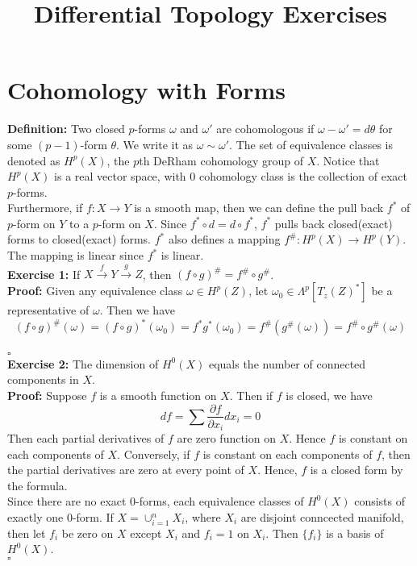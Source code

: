\documentclass[12pt]{amsart}
\title{Differential Topology Exercises}
\newcommand{\df}{\textbf{Definition: }}
\begin{document}
\maketitle
\section{Cohomology with Forms}
\df Two closed $p$-forms $\omega$ and $\omega'$ are cohomologous if $\omega-\omega'=d \theta$ for some $(p-1)$-form $\theta$. We write it as $\omega\sim\omega'$. The set of equivalence classes is denoted as $H^p(X)$, the $p$th DeRham cohomology group of $X$. Notice that $H^p(X)$ is a real vector space, with $0$ cohomology class is the collection of exact $p$-forms.\\
Furthermore, if $f:X \rightarrow Y$ is a smooth map, then we can define the pull back $f^\ast$ of $p$-form on $Y$ to a $p$-form on $X$. Since
$f^\ast\circ d= d\circ f^\ast$, $f^\ast$ pulls back closed(exact) forms to closed(exact) forms. $f^\ast$ also defines a mapping $f^\#:H^p(X)\rightarrow H^p(Y)$. The mapping is linear since $f^\ast$ is linear.\\
\indent\textbf{Exercise 1:} If $X\xrightarrow{f}Y\xrightarrow{g}Z$, then $
    (f\circ g)^\#=f^\#\circ g^\#$.\\
\indent\textbf{Proof:} Given any equivalence class $\omega\in H^p(Z)$, let $\omega_0\in\Lambda^p[T_z(Z)^\ast]$ be a representative of $\omega$. Then we have
\[(f\circ g)^\#(\omega)=(f\circ g)^\ast(\omega_0)=f^\ast g^\ast (\omega_0)=f^\#(g^\#(\omega))=f^\#\circ g^\#(\omega)\]
\\\phantom{qed}\hfill$\square$\\
\indent \textbf{Exercise 2:} The dimension of $H^0(X)$ equals the number of connected components in $X$.\\
\indent \textbf{Proof:} 
Suppose $f$ is a smooth function on $X$. Then if $f$ is closed, we have 
\[df=\sum \frac{\partial f}{\partial x_i}dx_i=0\]
Then each partial derivatives of $f$ are zero function on $X$. Hence $f$ is constant on each components of $X$. Conversely, if $f$ is constant on each components of $f$, then the partial derivatives are zero at every point of $X$. Hence, $f$ is a closed form by the formula.\\
Since there are no exact 0-forms, each equivalence classes of $H^0(X)$ consists of exactly one 0-form. If $X=\cup_{i=1}^n X_i$, where $X_i$ are disjoint conncected manifold, then let $f_i$ be zero on $X$ except $X_i$ and $f_i=1$ on $X_i$. Then $\{f_i\}$ is a basis of $H^0(X)$.
\\\phantom{qed}\hfill$\square$\\
\end{document}
